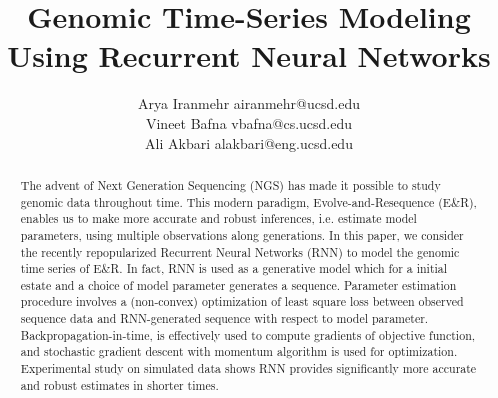\documentclass[twoside,11pt]{article}
\date
\begin{document}
\title{Genomic Time-Series Modeling Using Recurrent Neural Networks}
\author{\name Arya Iranmehr  \email airanmehr@ucsd.edu \\ 
\name Vineet Bafna \email vbafna@cs.ucsd.edu \\
\name Ali Akbari \email alakbari@eng.ucsd.edu }

\maketitle
\begin{abstract}
The advent of Next Generation Sequencing (NGS) has made it possible to study genomic data throughout time. This modern paradigm, Evolve-and-Resequence (E\&R), enables us to make more accurate and robust inferences, i.e. estimate model parameters, using multiple observations along generations. In this paper, we consider the recently repopularized Recurrent Neural Networks (RNN) to model the genomic time series of E\&R. In fact, RNN is used as a generative model which for a initial estate and a choice of model parameter generates a sequence. Parameter estimation procedure involves a (non-convex) optimization of least square loss between observed sequence data and RNN-generated sequence with respect to model parameter. Backpropagation-in-time, is effectively used to compute gradients of objective function, and stochastic gradient descent with momentum algorithm is used for  optimization. Experimental study on simulated data shows RNN provides significantly more accurate and robust estimates in shorter times.
\end{abstract}

\cite{multilocus-gp}
\cite{multilocus-hitchhike}
\cite{msms}
\cite{simupop}
\cite{ilya-thesis}
\cite{theano}
\citep{backprop}






\end{document}
